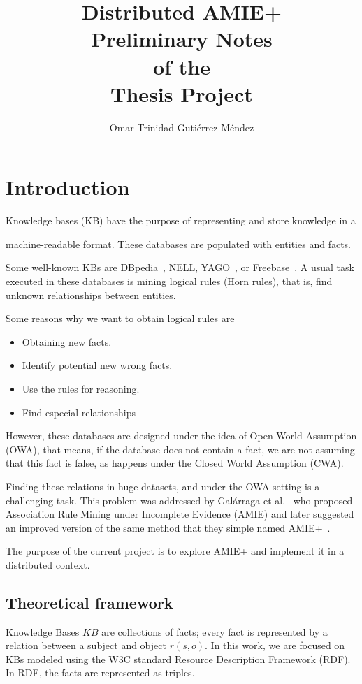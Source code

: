 \documentclass{article}
\title{
Distributed AMIE+\\
\large
Preliminary Notes\\
of the\\
Thesis Project
}
\author{Omar Trinidad Guti\'errez M\'endez}
\begin{document}
\maketitle

\section{Introduction}

Knowledge bases (KB) have the purpose of representing and store knowledge in a

machine-readable format. These databases are populated with entities and facts.

Some well-known KBs are DBpedia~\cite{dbpedia-swj},
NELL, YAGO~\cite{suchanek2007yago}, or Freebase~\cite{bollacker2008freebase}. A
usual task executed in these databases is mining logical rules (Horn rules), that is, find
unknown relationships between entities.

Some reasons why we want to obtain logical rules are

\begin{itemize}
    \item Obtaining new facts.
    \item Identify potential new wrong facts.
    \item Use the rules for reasoning.
    \item Find especial relationships
\end{itemize}

However,  these databases are designed under the idea of Open World Assumption
(OWA), that means, if the database does not contain a fact, we are not assuming
that this fact is false, as happens under the Closed World Assumption (CWA).

Finding these relations in huge datasets, and under the OWA setting is a
challenging task. This problem was addressed by Galárraga et
al.~\cite{galarraga2013amie}  who proposed Association Rule Mining under
Incomplete Evidence (AMIE) and later suggested an improved version of the same
method that they simple named AMIE+~\cite{galarraga2015fast}.

The purpose of the current project is to explore AMIE+ and implement it in a
distributed context.

\subsection{Theoretical framework}

Knowledge Bases $KB$ are collections of facts; every fact is represented by a
relation between a subject and object $r(s, o)$. In this work, we are focused
on KBs modeled using the W3C standard Resource Description Framework
(RDF). In RDF, the facts are represented as triples.
\end{document}
